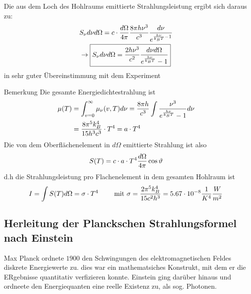 Die aus dem Loch des Hohlraums emittierte Strahlungsleistung ergibt sich daraus
zu:
\begin{gather*}
    S_{\nu} d\nu d\Omega = c \cdot \frac{d\Omega}{4\pi} \frac{8 \pi h \nu^3}{c^3}
    \frac{d\nu}{e^{\frac{h\nu}{k_B T} -1}} \\
    \rightarrow \boxed{
        S_{\nu} d\nu d\Omega 
        =
        \frac{2 h \nu^3}{c^2} \frac{d\nu d\Omega}{e^{\frac{h\nu}{k_B T}}-1}
        }
\end{gather*}
in sehr guter Übereinstimmung mit dem Experiment
\begin{erl}{Bemerkung}
Die gesamte Energiedichtestrahlung ist
\begin{align*}
    \mu(T)
    &=
    \int_{v=0}^{\infty} \mu_{\nu} (v,T) d\nu
    =
    \frac{8 \pi h}{c^3} \int \frac{\nu^3}{e^{\frac{h \nu}{k_B T}}-1} d\nu \\
    &=
    \frac{8\pi^5 k_B^4}{15 h^3 c^3}\cdot T^4 = a \cdot T^4  
\end{align*}
Die von dem Oberflächenelement in $d\Omega$ emittierte Strahlung ist also
\begin{equation*}
    S(T) = c \cdot a \cdot T^4 \frac{d\Omega}{4\pi} \cos \vartheta
\end{equation*}
d.h die Strahlungsleistung pro Flachenelement in dem gesamten Hohlraum ist
\begin{equation*}
   I = \int S(T) d\Omega = \sigma \cdot T^4 \qquad \text{ mit $\sigma = \frac{2\pi^5
   k_B^4}{15c^2 h^3} = 5.67 \cdot 10^{-8} \frac{1}{K^4}\frac{W}{m^2}$}
\end{equation*}
\end{erl}
\subsection{Herleitung der Planckschen Strahlungsformel nach Einstein} %
\label{sub:Herleitung_der_Planckschen_Strahlungsformel_nach_Einstein}
Max Planck ordnete $1900$ den Schwingungen des elektromagnetischen Feldes
diskrete Energiewerte zu. dies war ein mathematsiches Konstrukt, mit dem er die
ERgebnisse quantitativ verfizieren konnte. Einstein ging darüber hinaus und
ordneete den Energiequanten eine reelle Existenz zu, als sog. Photonen.

